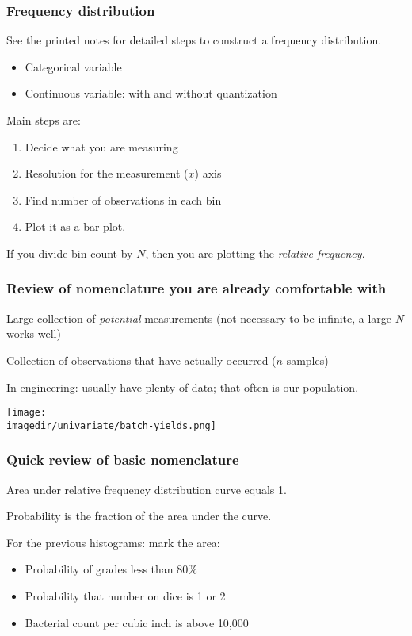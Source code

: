 \begin{frame}\frametitle{Frequency distribution}

	See the printed notes for detailed steps to construct a frequency distribution.
	\begin{itemize}
		\item	Categorical variable
		\item	Continuous variable: with and without quantization
	\end{itemize}

	Main steps are:
	\begin{enumerate}
		\item	Decide what you are measuring
		\item	Resolution for the measurement ($x$) axis
		\item	Find number of observations in each bin
		\item	Plot it as a bar plot.
	\end{enumerate}

	If you divide bin count by $N$, then you are plotting the \emph{relative frequency}.
\end{frame}

\begin{frame}\frametitle{Review of nomenclature you are already comfortable with}
	{}

	Large collection of \emph{potential} measurements (not necessary to be infinite, a large $N$ works well)

	{}

	Collection of observations that have actually occurred ($n$ samples)

	In engineering: usually have plenty of data; that often is our population.

	\begin{center}
		\texttt{[image: \\imagedir/univariate/batch-yields.png]}
	\end{center}
\end{frame}

\begin{frame}\frametitle{Quick review of basic nomenclature}
	{}

	Area under relative frequency distribution curve equals 1.

	Probability is the fraction of the area under the curve.

	For the previous histograms: mark the area:
	\begin{itemize}
		\item	Probability of grades less than 80\%
		\item	Probability that number on dice is 1 or 2
		\item	Bacterial count per cubic inch is above 10,000
	\end{itemize}
\end{frame}

